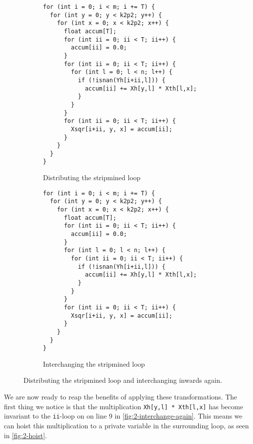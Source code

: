 \begin{figure}[H]
\centering
\begin{subfigure}{.55\textwidth}
  \centering
\begin{verbatim}
for (int i = 0; i < m; i += T) {
  for (int y = 0; y < k2p2; y++) {
    for (int x = 0; x < k2p2; x++) {
      float accum[T];
      for (int ii = 0; ii < T; ii++) {
        accum[ii] = 0.0;
      }
      for (int ii = 0; ii < T; ii++) {
        for (int l = 0; l < n; l++) {
          if (!isnan(Yh[i+ii,l])) {
            accum[ii] += Xh[y,l] * Xth[l,x];
          }
        }
      }
      for (int ii = 0; ii < T; ii++) {
        Xsqr[i+ii, y, x] = accum[ii];
      }
    }
  }
}
\end{verbatim}
  \caption{Distributing the stripmined loop}
  \label{fig:2-distrib}
\end{subfigure}%
\begin{subfigure}{.5\textwidth}
  \centering
\begin{verbatim}
for (int i = 0; i < m; i += T) {
  for (int y = 0; y < k2p2; y++) {
    for (int x = 0; x < k2p2; x++) {
      float accum[T];
      for (int ii = 0; ii < T; ii++) {
        accum[ii] = 0.0;
      }
      for (int l = 0; l < n; l++) {
        for (int ii = 0; ii < T; ii++) {
          if (!isnan(Yh[i+ii,l])) {
            accum[ii] += Xh[y,l] * Xth[l,x];
          }
        }
      }
      for (int ii = 0; ii < T; ii++) {
        Xsqr[i+ii, y, x] = accum[ii];
      }
    }
  }
}
\end{verbatim}
  \caption{Interchanging the stripmined loop}
  \label{fig:2-interchange-again}
\end{subfigure}
\caption{Distributing the stripmined loop and interchanging inwards again.}
\label{fig:2-opt-2-badname}
\end{figure}

We are now ready to reap the benefits of applying these transformations.
The first thing we notice is that the multiplication
\texttt{Xh[y,l] * Xth[l,x]} has become invariant to the \texttt{ii}-loop on on
line 9 in \autoref{fig:2-interchange-again}.
This means we can hoist this multiplication to a private variable in the
surrounding loop, as seen in \autoref{fig:2-hoist}.

